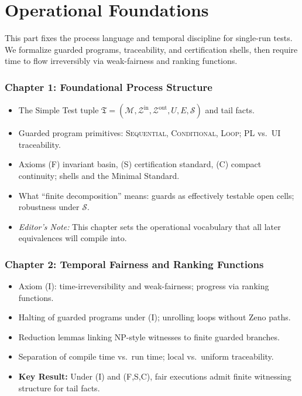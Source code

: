 \documentclass[12pt]{article}
\begin{document}
\newpage
\tableofcontents
\newpage

\part[Operational Foundations]{Operational Foundations}

This part fixes the process language and temporal discipline for single-run tests. We formalize guarded programs, traceability, and certification shells, then require time to flow irreversibly via weak-fairness and ranking functions.

\section*{Chapter 1: Foundational Process Structure}
\begin{itemize}
  \item The Simple Test tuple $\mathfrak T=(\mathcal M,\mathcal Z^{\mathrm{in}},\mathcal Z^{\mathrm{out}},U,E,\mathcal S)$ and tail facts.
  \item Guarded program primitives: \textsc{Sequential}, \textsc{Conditional}, \textsc{Loop}; PL vs.\ UI traceability.
  \item Axioms (F) invariant basin, (S) certification standard, (C) compact continuity; shells and the Minimal Standard.
  \item What “finite decomposition” means: guards as effectively testable open cells; robustness under $\mathcal S$.
  \item \textit{Editor’s Note:} This chapter sets the operational vocabulary that all later equivalences will compile into.
\end{itemize}

\section*{Chapter 2: Temporal Fairness and Ranking Functions}
\begin{itemize}
  \item Axiom (I): time-irreversibility and weak-fairness; progress via ranking functions.
  \item Halting of guarded programs under (I); unrolling loops without Zeno paths.
  \item Reduction lemmas linking NP-style witnesses to finite guarded branches.
  \item Separation of compile time vs.\ run time; local vs.\ uniform traceability.
  \item \textbf{Key Result:} Under (I) and (F,S,C), fair executions admit finite witnessing structure for tail facts.
\end{itemize}
\end{document}
